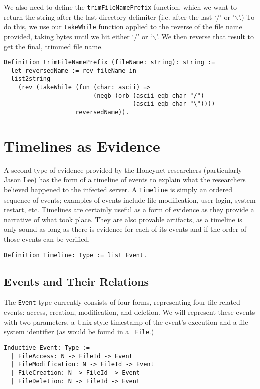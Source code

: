 \documentclass[nocopyrightspace,preprint]{sigplanconf}
\begin{document}
We also need to define the {\tt trimFileNamePrefix} function, which we want to
return the string after the last directory delimiter (i.e. after the last `/'
or '$\backslash$'.) To do this, we use our {\tt takeWhile} function applied
to the reverse of the file name provided, taking bytes until we hit either `/'
or `$\backslash$'. We then reverse that result to get the final, trimmed file
name.

\begin{lstlisting}
Definition trimFileNamePrefix (fileName: string): string :=
  let reversedName := rev fileName in
  list2string
    (rev (takeWhile (fun (char: ascii) => 
                         (negb (orb (ascii_eqb char "/")
                                    (ascii_eqb char "\"))))
                    reversedName)).
\end{lstlisting}

\section{Timelines as Evidence}
\label{sec:timelines}

A second type of evidence provided by the Honeynet researchers (particularly
Jason Lee\cite{lee}) has the form of a timeline of events to explain what the
researchers believed happened to the infected server. A {\tt Timeline} is
simply an ordered sequence of events; examples of events include file
modification, user login, system restart, etc. Timelines are certainly useful
as a form of evidence as they provide a narrative of what took place. They are
also provable artifacts, as a timeline is only sound as long as there is
evidence for each of its events and if the order of those events can be
verified. 

\begin{lstlisting}
Definition Timeline: Type := list Event.
\end{lstlisting}

\subsection{Events and Their Relations}

The {\tt Event} type currently consists of four forms, representing four
file-related events: access, creation, modification, and deletion. We will
represent these events with two parameters, a Unix-style timestamp of the
event's execution and a file system identifier (as would be found in a {\tt
File}.)

\begin{lstlisting}
Inductive Event: Type :=
  | FileAccess: N -> FileId -> Event
  | FileModification: N -> FileId -> Event
  | FileCreation: N -> FileId -> Event
  | FileDeletion: N -> FileId -> Event
\end{lstlisting}
\end{document}
